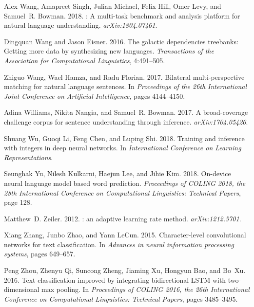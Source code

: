 \documentclass[11pt,a4paper]{article}
\begin{document}
\begin{thebibliography}{40}
Alex Wang, Amapreet Singh, Julian Michael, Felix Hill, Omer Levy, and Samuel~R.
  Bowman. 2018.
: A multi-task benchmark and analysis platform for natural
  language understanding.
\newblock \emph{arXiv:1804.07461}.

Dingquan Wang and Jason Eisner. 2016.
\newblock The galactic dependencies treebanks: Getting more data by
  synthesizing new languages.
\newblock \emph{Transactions of the Association for Computational Linguistics},
  4:491--505.

Zhiguo Wang, Wael Hamza, and Radu Florian. 2017.
\newblock Bilateral multi-perspective matching for natural language sentences.
\newblock In \emph{Proceedings of the 26th International Joint Conference on
  Artificial Intelligence}, pages 4144--4150.

Adina Williams, Nikita Nangia, and Samuel~R. Bowman. 2017.
\newblock A broad-coverage challenge corpus for sentence understanding through
  inference.
\newblock \emph{arXiv:1704.05426}.

Shuang Wu, Guoqi Li, Feng Chen, and Luping Shi. 2018.
\newblock Training and inference with integers in deep neural networks.
\newblock In \emph{International Conference on Learning Representations}.

Seunghak Yu, Nilesh Kulkarni, Haejun Lee, and Jihie Kim. 2018.
\newblock On-device neural language model based word prediction.
\newblock \emph{Proceedings of COLING 2018, the 28th International Conference
  on Computational Linguistics: Technical Papers}, page 128.

Matthew~D. Zeiler. 2012.
: an adaptive learning rate method.
\newblock \emph{arXiv:1212.5701}.

Xiang Zhang, Junbo Zhao, and Yann LeCun. 2015.
\newblock Character-level convolutional networks for text classification.
\newblock In \emph{Advances in neural information processing systems}, pages
  649--657.

Peng Zhou, Zhenyu Qi, Suncong Zheng, Jiaming Xu, Hongyun Bao, and Bo~Xu. 2016.
\newblock Text classification improved by integrating bidirectional {LSTM} with
  two-dimensional max pooling.
\newblock In \emph{Proceedings of COLING 2016, the 26th International
  Conference on Computational Linguistics: Technical Papers}, pages 3485--3495.

\end{thebibliography}
\end{document}

